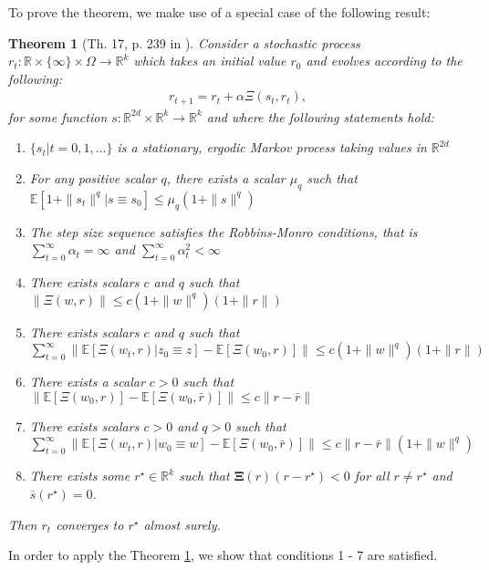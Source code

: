 \documentclass{article}
\newtheorem{theorem}{Theorem}
\begin{document}
To prove the theorem, we make use of a special case of the following result:

\begin{theorem}[Th. 17, p. 239 in \cite{benveniste2012adaptive}] \label{theorem:stoch.approx.}
Consider a stochastic process $r_t:\mathbb{R}\times\{\infty\}\times\Omega\to\mathbb{R}^k$ which takes an initial value $r_0$ and evolves according to the following:
\begin{align}
    r_{t+1}=r_t+\alpha \Xi(s_t,r_t),
\end{align}
for some function $s:\mathbb{R}^{2d}\times\mathbb{R}^k\to\mathbb{R}^k$ and where the following statements hold:
\begin{enumerate}
    \item $\{s_t|t=0,1,\ldots\}$ is a stationary, ergodic Markov process taking values in $\mathbb{R}^{2d}$
    \item For any positive scalar $q$, there exists a scalar $\mu_q$ such that $\mathbb{E}\left[1+\|s_t\|^q|s\equiv s_0\right]\leq \mu_q\left(1+\|s\|^q\right)$
    \item The step size sequence satisfies the Robbins-Monro conditions, that is $\sum_{t=0}^\infty\alpha_t=\infty$ and $\sum_{t=0}^\infty\alpha^2_t<\infty$
    \item There exists scalars $c$ and $q$ such that $    \|\Xi(w,r)\|
        \leq c\left(1+\|w\|^q\right)(1+\|r\|)$
    \item There exists scalars $c$ and $q$ such that $
        \sum_{t=0}^\infty\left\|\mathbb{E}\left[\Xi(w_t,r)|z_0\equiv z\right]-\mathbb{E}\left[\Xi(w_0,r)\right]\right\|
        \leq c\left(1+\|w\|^q\right)(1+\|r\|)$
    \item There exists a scalar $c>0$ such that $
        \left\|\mathbb{E}[\Xi(w_0,r)]-\mathbb{E}[\Xi(w_0,\bar{r})]\right\|\leq c\|r-\bar{r}\| $
    \item There exists scalars $c>0$ and $q>0$ such that $
        \sum_{t=0}^\infty\left\|\mathbb{E}\left[\Xi(w_t,r)|w_0\equiv w\right]-\mathbb{E}\left[\Xi(w_0,\bar{r})\right]\right\|
        \leq c\|r-\bar{r}\|\left(1+\|w\|^q\right) $
    \item There exists some $r^\star\in\mathbb{R}^k$ such that $\boldsymbol{\Xi}(r)(r-r^\star)<0$ for all $r \neq r^\star$ and $\bar{s}(r^\star)=0$. 
\end{enumerate}
Then $r_t$ converges to $r^\star$ almost surely.
\end{theorem}

In order to apply the Theorem \ref{theorem:stoch.approx.}, we show that conditions 1 - 7 are satisfied.
\end{document}
